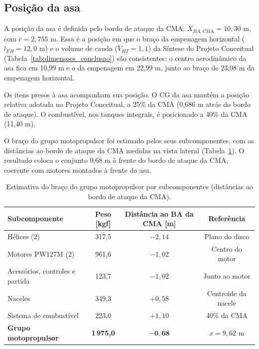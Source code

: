 \subsection{Posição da asa}

A posição da asa é definida pelo bordo de ataque da CMA, $X_{BA,\text{CMA}} = 10{,}30$ m, com $\bar{c} = 2{,}755$ m. Essa é a posição em que o braço da empenagem horizontal ($l_{EH} = 12{,}0$ m) e o volume de cauda ($\bar{V}_{HT} = 1{,}1$) da Síntese do Projeto Conceitual (Tabela~\ref{tab:dimensoes_conclusao}) são consistentes: o centro aerodinâmico da asa fica em 10,99 m e o da empenagem em 22,99 m, junto ao braço de 23,08 m da empenagem horizontal.

Os itens presos à asa acompanham sua posição. O CG da asa mantém a posição relativa adotada no Projeto Conceitual, a 25\% da CMA (0,686 m atrás do bordo de ataque). O combustível, nos tanques integrais, é posicionado a 40\% da CMA (11,40 m).

O braço do grupo motopropulsor foi estimado pelos seus subcomponentes, com as distâncias ao bordo de ataque da CMA medidas na vista lateral (Tabela~\ref{tab:cg_gmp}). O resultado coloca o conjunto 0,68 m à frente do bordo de ataque da CMA, coerente com motores montados à frente da asa.

\begin{table}[H]
  \centering
  \linespread{1}\small
  \setlength{\tabcolsep}{4pt}
  \caption{Estimativa do braço do grupo motopropulsor por subcomponentes (distâncias ao bordo de ataque da CMA).}
  \label{tab:cg_gmp}
  \begin{tabularx}{\textwidth}{>{\raggedright\arraybackslash}X c c c}
    \toprule
    \textbf{Subcomponente} & \textbf{Peso [kgf]} & \textbf{Distância ao BA da CMA [m]} & \textbf{Referência} \\
    \midrule
    Hélices (2) & 317,5 & $-2{,}14$ & Plano do disco \\
    Motores PW127M (2) & 961,6 & $-1{,}02$ & Centro do motor \\
    Acessórios, controles e partida & 123,7 & $-1{,}02$ & Junto ao motor \\
    Naceles & 349,3 & $+0{,}58$ & Centroide da nacele \\
    Sistema de combustível & 223,0 & $+1{,}10$ & 40\% da CMA \\
    \midrule
    \textbf{Grupo motopropulsor} & \textbf{1\,975,0} & $\mathbf{-0{,}68}$ & $x = 9{,}62$ m \\
    \bottomrule
  \end{tabularx}
\end{table}

